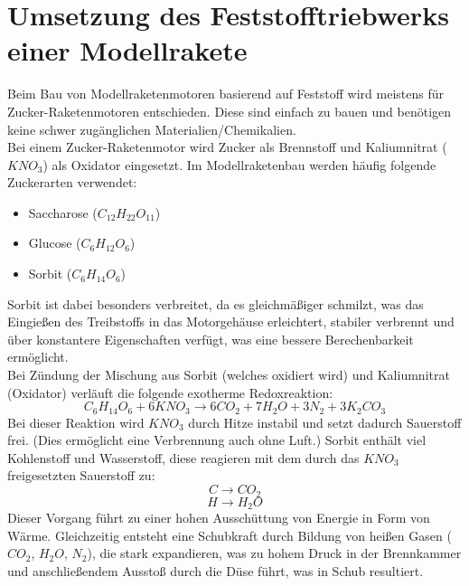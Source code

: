\section{Umsetzung des Feststofftriebwerks einer Modellrakete}
\label{sec:solid_fuel_model_rocket_implementation}
Beim Bau von Modellraketenmotoren basierend auf Feststoff wird meistens für Zucker-Raketenmotoren entschieden. Diese sind einfach zu bauen und benötigen keine schwer zugänglichen Materialien/Chemikalien.
\\
Bei einem Zucker-Raketenmotor wird Zucker als Brennstoff und Kaliumnitrat ($KNO_3$) als Oxidator eingesetzt. Im Modellraketenbau werden häufig folgende Zuckerarten verwendet:
\begin{itemize}
    \item Saccharose ($C_{12}H_{22}O_{11}$)
    \item Glucose ($C_6H_{12}O_6$)
    \item Sorbit ($C_6H_{14}O_6$)
\end{itemize}
Sorbit ist dabei besonders verbreitet, da es gleichmäßiger schmilzt, was das Eingießen des Treibstoffs in das Motorgehäuse erleichtert, stabiler verbrennt und über konstantere Eigenschaften verfügt, was eine bessere Berechenbarkeit ermöglicht.
\\
Bei Zündung der Mischung aus Sorbit (welches oxidiert wird) und Kaliumnitrat (Oxidator) verläuft die folgende exotherme Redoxreaktion:
\begin{equation}
    C_6H_{14}O_6 + 6KNO_3 \to 6CO_2 + 7H_2O + 3N_2 + 3K_2CO_3
\end{equation}
Bei dieser Reaktion wird $KNO_3$ durch Hitze instabil und setzt dadurch Sauerstoff frei. (Dies ermöglicht eine Verbrennung auch ohne Luft.) Sorbit enthält viel Kohlenstoff und Wasserstoff, diese reagieren mit dem durch das $KNO_3$ freigesetzten Sauerstoff zu:
\begin{equation}
    C \to CO_2 
\end{equation} 
\begin{equation}
    H \to H_2O
\end{equation}
Dieser Vorgang führt zu einer hohen Ausschüttung von Energie in Form von Wärme. Gleichzeitig entsteht eine Schubkraft durch Bildung von heißen Gasen ($CO_2$, $H_2O$, $N_2$), die stark expandieren, was zu hohem Druck in der Brennkammer und anschließendem Ausstoß durch die Düse führt, was in Schub resultiert.

\cleardoublepage
